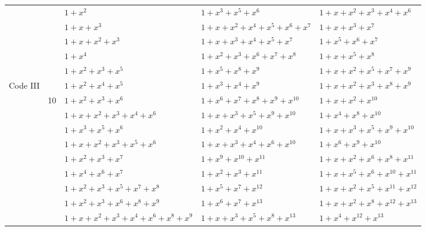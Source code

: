 \documentclass[journal,draftcls,onecolumn,12pt,twoside]{IEEEtran}
\begin{document}
\begin{table}[htbp]
\begin{tabularx}{0.95\textwidth}{c|cXXX}
			\cline{2-5}
			&&$1+x^2$ 								& $1+x^3+x^5+x^6$ 					& $1+x+x^2+x^{3}+x^{4}+x^6$\\
			&&$1+x+x^3$ 								& $1+x+x^2+x^4+x^5+x^6+x^7$ 	& $1+x+x^{3}+x^{7}$\\
			&&$1+x+x^2+x^3$ 				& $1+x+x^3+x^4+x^5+x^7$ 			& $1+x^{5}+x^6+x^7$\\
			&&$1+x^4$ 								& $1+x^2+x^3+x^6+x^7+x^8$ 		& $1+x+x^{5}+x^8$\\
			&&$1+x^2+x^3+x^5$ 						& $1+x^5+x^8+x^9$ 					& $1+x+x^{2}+x^5+x^7+x^9$\\
			Code III&&$1+x^2+x^4+x^5$ 						& $1+x^3+x^4+x^9$ 					& $1+x+x^{2}+x^3+x^8+x^9$\\
			&10&$1+x^2+x^3+x^6$ 						& $1+x^6+x^7+x^8+x^9+x^{10}$ 	& $1+x+x^2+x^{10}$\\
			&&$1+x+x^2+x^3+x^4+x^6$ 				& $1+x+x^3+x^5+x^9+x^{10}$ 		& $1+x^4+x^8+x^{10}$\\
			&&$1+x^3+x^5+x^6$ 						& $1+x^2+x^4+x^{10}$ 				& $1+x+x^{3}+x^{5}+x^9+x^{10}$\\
			&&$1+x+x^2+x^3+x^5+x^6$ 				& $1+x+x^3+x^4+x^6+x^{10}$ 		& $1+x^{6}+x^{9}+x^{10}$\\
			&&$1+x^2+x^3+x^7$ 						& $1+x^9+x^{10}+x^{11}$ 			& $1+x+x^{2}+x^{6}+x^8+x^{11}$\\
			&&$1+x^4+x^6+x^7$ 						& $1+x^2+x^3+x^{11}$ 				& $1+x+x^{5}+x^6+x^{10}+x^{11}$\\
			&&$1+x^2+x^3+x^5+x^7+x^8$ 			& $1+x^5+x^7+x^{12}$ 				& $1+x+x^{2}+x^5+x^{11}+x^{12}$\\
			&&$1+x^2+x^3+x^6+x^8+x^9$ 			& $1+x^6+x^7+x^{13}$ 				& $1+x+x^2+x^8+x^{12}+x^{13}$\\
			&&$1+x+x^2+x^3+x^4+x^6+x^8+x^9$ 	& $1+x+x^3+x^5+x^8+x^{13}$ 		& $1+x^{4}+x^{12}+x^{13}$\\
			\bottomrule
		\end{tabularx}		
		\label{code-tables-not-found}
	\end{table}
	
\end{document}
